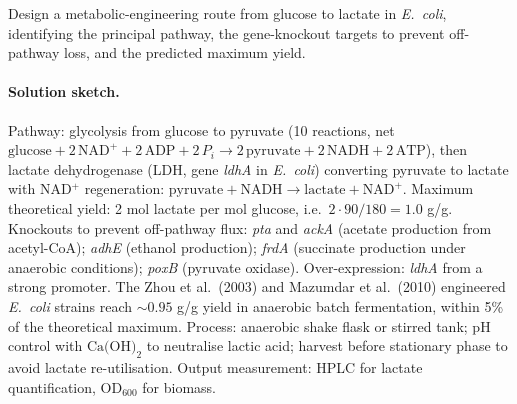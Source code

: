 \begin{exercise}
Design a metabolic-engineering route from glucose to lactate in
\emph{E.\ coli}, identifying the principal pathway, the
gene-knockout targets to prevent off-pathway loss, and the predicted
maximum yield.

\paragraph{Solution sketch.}
Pathway: glycolysis from glucose to pyruvate (10 reactions, net
$\text{glucose} + 2\,\text{NAD}^{+} + 2\,\text{ADP} + 2\,P_{i}
\to 2\,\text{pyruvate} + 2\,\text{NADH} + 2\,\text{ATP}$), then
lactate dehydrogenase (LDH, gene \emph{ldhA} in \emph{E.\ coli})
converting pyruvate to lactate with NAD${}^{+}$ regeneration:
$\text{pyruvate} + \text{NADH} \to \text{lactate} + \text{NAD}^{+}$.
Maximum theoretical yield: 2 mol lactate per mol glucose, i.e.\
$2 \cdot 90/180 = 1.0$ g/g. Knockouts to prevent off-pathway flux:
\emph{pta} and \emph{ackA} (acetate production from acetyl-CoA);
\emph{adhE} (ethanol production); \emph{frdA} (succinate production
under anaerobic conditions); \emph{poxB} (pyruvate oxidase).
Over-expression: \emph{ldhA} from a strong promoter. The Zhou et al.\
(2003) and Mazumdar et al.\ (2010) engineered \emph{E.\ coli} strains
reach $\sim 0.95$ g/g yield in anaerobic batch fermentation,
within 5\% of the theoretical maximum. Process: anaerobic shake
flask or stirred tank; pH control with $\text{Ca(OH)}_{2}$ to
neutralise lactic acid; harvest before stationary phase to avoid
lactate re-utilisation. Output measurement: HPLC for lactate
quantification, OD$_{600}$ for biomass.
\end{exercise}

